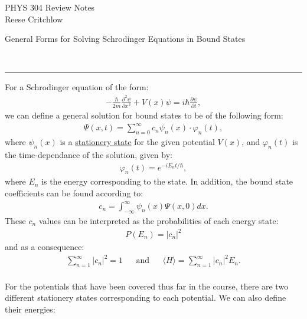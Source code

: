 \documentclass{article}
\newcommand{\header}[1]{\begin{large}\noindent #1\end{large}\\\rule{\textwidth}{0.5pt}}
\newcommand{\gap}{\medskip\\}
\begin{document}
    \begin{center}
        \Large PHYS 304 Review Notes\\
        \normalsize Reese Critchlow
    \end{center}

    \header{General Forms for Solving Schrodinger Equations in Bound States}

    For a Schrodinger equation of the form:
    \begin{align*}
        -\frac{\hbar}{2m} \frac{\partial^2 \psi}{\partial x^2} + V(x) \psi = i\hbar \frac{\partial \psi}{\partial t},
    \end{align*}
    we can define a general solution for bound states to be of the 
    following form:
    \begin{align*}
        \Psi(x, t) = \sum_{n=0}^{\infty} c_n \psi_n(x) \cdot \varphi_n(t),
    \end{align*}
    where $\psi_n(x)$ is a \underline{stationery state} for the given potential
    $V(x)$, and $\varphi_n(t)$ is the time-dependance of the solution,
    given by:
    \begin{align*}
        \varphi_n(t) = e^{-iE_n t/\hbar},
    \end{align*}
    where $E_n$ is the energy corresponding to the state. In addition, 
    the bound state coefficients can be found according to:
    \begin{align*}
        c_n = \int_{-\infty}^\infty \psi_n(x) \Psi(x, 0)dx.
    \end{align*}
    These $c_n$ values can be interpreted as the probabilities of 
    each energy state:
    \begin{align*}
        P(E_n) = |c_n|^2
    \end{align*}
    and as a consequence:
    \begin{align*}
        \sum_{n = 1}^\infty |c_n|^2  = 1 && \textrm{and} && \langle H \rangle  = \sum_{n = 1}^\infty |c_n|^2 E_n. 
    \end{align*}
    \gap
    For the potentials that have been covered thus far in the course,
    there are two different stationery states corresponding to each 
    potential. We can also define their energies:
\end{document}
